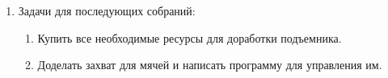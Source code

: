 \begin{enumerate}
\begin{enumerate}
    \end{enumerate}
    
	\item Задачи для последующих собраний:\newline
	\begin{enumerate}
	  \item Купить все необходимые ресурсы для доработки подъемника.\newline
	  
	  \item Доделать захват для мячей и написать программу для управления им.\newline

    \end{enumerate}     
\end{enumerate}

\fillpage
